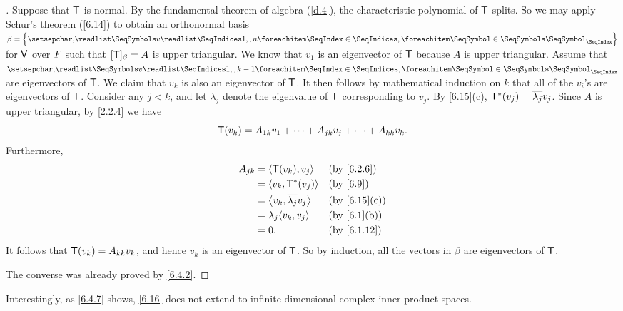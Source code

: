 \begin{proof}[]
	Suppose that \(\mathsf{T}\) is normal.
	By the fundamental theorem of algebra (\cref{d.4}), the characteristic polynomial of \(\mathsf{T}\) splits.
	So we may apply Schur's theorem (\cref{6.14}) to obtain an orthonormal basis \(\beta = \set{\seq{v}{1,,n}}\) for \(\mathsf{V}\) over \(\mathit{F}\) such that \([\mathsf{T}]_{\beta} = A\) is upper triangular.
	We know that \(v_1\) is an eigenvector of \(\mathsf{T}\) because \(A\) is upper triangular.
	Assume that \(\seq{v}{1,,k-1}\) are eigenvectors of \(\mathsf{T}\).
	We claim that \(v_k\) is also an eigenvector of \(\mathsf{T}\).
	It then follows by mathematical induction on \(k\) that all of the \(v_i\)'s are eigenvectors of \(\mathsf{T}\).
	Consider any \(j < k\), and let \(\lambda_j\) denote the eigenvalue of \(\mathsf{T}\) corresponding to \(v_j\).
	By \cref{6.15}(c), \(\mathsf{T}^*(v_j) = \overline{\lambda_j} v_j\).
	Since \(A\) is upper triangular, by \cref{2.2.4} we have
	\[
		\mathsf{T}(v_k) = A_{1 k} v_1 + \cdots + A_{j k} v_j + \cdots + A_{k k} v_k.
	\]
	Furthermore,
	\begin{align*}
		A_{j k} & = \inn{\T(v_k), v_j}              &  & \by{6.2.6}   \\
		        & = \inn{v_k, \T^*(v_j)}            &  & \by{6.9}     \\
		        & = \inn{v_k, \conj{\lambda_j} v_j} &  & \by{6.15}[c] \\
		        & = \lambda_j \inn{v_k, v_j}        &  & \by{6.1}[b]  \\
		        & = 0.                              &  & \by{6.1.12}
	\end{align*}
	It follows that \(\mathsf{T}(v_k) = A_{k k} v_k\), and hence \(v_k\) is an eigenvector of \(\mathsf{T}\).
	So by induction, all the vectors in \(\beta\) are eigenvectors of \(\mathsf{T}\).

	The converse was already proved by \cref{6.4.2}.
\end{proof}

\begin{note}
	Interestingly, as \cref{6.4.7} shows, \cref{6.16} does not extend to infinite-dimensional complex inner product spaces.
\end{note}

